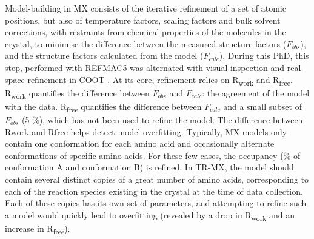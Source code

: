 Model-building in MX consists of the iterative refinement of a set of atomic positions, but also of temperature factors, scaling factors and bulk solvent corrections, with restraints from chemical properties of the molecules in the crystal, to minimise the difference between the measured structure factors (\(F_{obs}\)), and the structure factors calculated from the model (\(F_{calc}\)). During this PhD, this step, performed with REFMAC5 \parencite{murshudovRefinementMacromolecularStructures1997, yamashitaGEMMIServalcatRestrain2023} was alternated with visual inspection and real-space refinement in COOT \parencite{emsleyFeaturesDevelopmentCoot2010}. At its core, refinement relies on R\textsubscript{work} and R\textsubscript{free}. R\textsubscript{work} quantifies the difference between \(F_{obs}\) and \(F_{calc}\): the agreement of the model with the data. R\textsubscript{free} quantifies the difference between \(F_{calc}\) and a small subset of \(F_{obs}\) (5 \%), which has not been used to refine the model. The difference between Rwork and Rfree helps detect model overfitting. Typically, MX models only contain one conformation for each amino acid and occasionally alternate conformations of specific amino acids. For these few cases, the occupancy (\% of conformation A and conformation B) is refined. In TR-MX, the model should contain several distinct copies of a great number of amino acids, corresponding to each of the reaction species existing in the crystal at the time of data collection. Each of these copies has its own set of parameters, and attempting to refine such a model would quickly lead to overfitting (revealed by a drop in R\textsubscript{work} and an increase in R\textsubscript{free}). 

